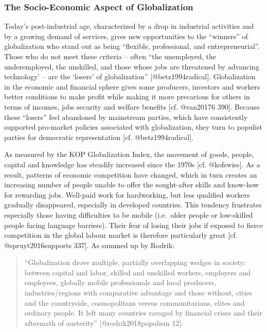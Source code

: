\documentclass[]{article}
\begin{document}
\subsubsection{The Socio-Economic Aspect of
Globalization}\label{the-socio-economic-aspect-of-globalization}

Today's post-industrial age, characterized by a drop in industrial
activities and by a growing demand of services, gives new opportunities
to the ``winners'' of globalization who stand out as being ``flexible,
professional, and entrepreneurial''. Those who do not meet these
criteria -- often ``the unemployed, the underemployed, the unskilled,
and those whose jobs are threatened by advancing technology' -- are the
`losers' of globalization'' {[}@betz1994radical{]}. Globalization in the
economic and financial sphere gives some producers, investors and
workers better conditions to make profit while making it more precarious
for others in terms of incomes, jobs security and welfare benefits
{[}cf. @van20176 390{]}. Because these ``losers'' feel abandoned by
mainstream parties, which have consistently supported pro-market
policies associated with globalization, they turn to populist parties
for democratic representation {[}cf. @betz1994radical{]}.

As measured by the KOP Globalization Index, the movement of goods,
people, capital and knowledge has steadily increased since the 1970s
{[}cf. @kofswiss{]}. As a result, patterns of economic competition have
changed, which in turn creates an increasing number of people unable to
offer the sought-after skills and know-how for rewarding jobs. Well-paid
work for hardworking, but less qualified workers gradually disappeared,
especially in developed countries. This tendency frustrates especially
those having difficulties to be mobile (i.e.~older people or low-skilled
people facing language barriers). Their fear of losing their jobs if
exposed to fierce competition in the global labour market is therefore
particularly great {[}cf. @spruyt2016supports 337{]}. As summed up by
Rodrik:

\begin{quote}
``Globalization drove multiple, partially overlapping wedges in society:
between capital and labor, skilled and unskilled workers, employers and
employees, globally mobile professionals and local producers,
industries/regions with comparative advantage and those without, cities
and the countryside, cosmopolitans versus communitarians, elites and
ordinary people. It left many countries ravaged by financial crises and
their aftermath of austerity'' {[}@rodrik2018populism 12{]}.
\end{quote}
\end{document}
